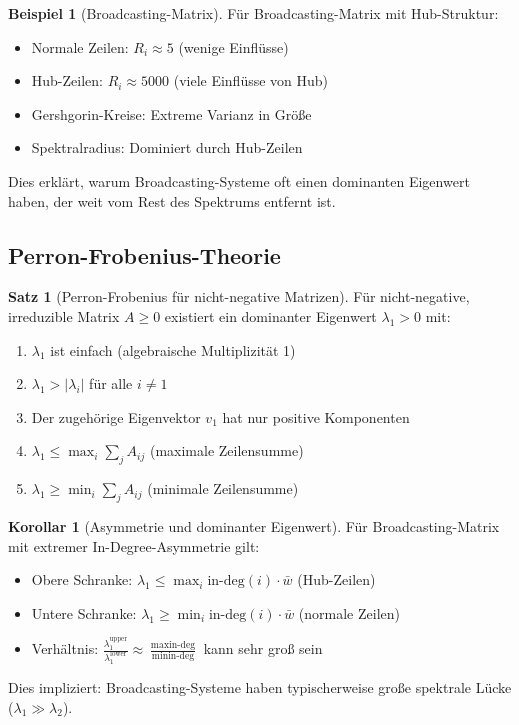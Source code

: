 ﻿\documentclass[a4paper,12pt]{report}
\theoremstyle{definition}
\newtheorem{beispiel}{Beispiel}
\newtheorem{satz}{Satz}
\newtheorem{korollar}{Korollar}
\begin{document}
	\begin{beispiel}[Broadcasting-Matrix]
		Für Broadcasting-Matrix mit Hub-Struktur:
		\begin{itemize}
			\item Normale Zeilen: $R_i \approx 5$ (wenige Einflüsse)
			\item Hub-Zeilen: $R_i \approx 5000$ (viele Einflüsse von Hub)
			\item Gershgorin-Kreise: Extreme Varianz in Größe
			\item Spektralradius: Dominiert durch Hub-Zeilen
		\end{itemize}
		
		Dies erklärt, warum Broadcasting-Systeme oft einen dominanten Eigenwert haben, der weit vom Rest des Spektrums entfernt ist.
	\end{beispiel}
	
	\subsection{Perron-Frobenius-Theorie}
	
	\begin{satz}[Perron-Frobenius für nicht-negative Matrizen]
		Für nicht-negative, irreduzible Matrix $A \geq 0$ existiert ein dominanter Eigenwert $\lambda_1 > 0$ mit:
		\begin{enumerate}
			\item $\lambda_1$ ist einfach (algebraische Multiplizität 1)
			\item $\lambda_1 > |\lambda_i|$ für alle $i \neq 1$
			\item Der zugehörige Eigenvektor $v_1$ hat nur positive Komponenten
			\item $\lambda_1 \leq \max_i \sum_j A_{ij}$ (maximale Zeilensumme)
			\item $\lambda_1 \geq \min_i \sum_j A_{ij}$ (minimale Zeilensumme)
		\end{enumerate}
	\end{satz}
	
	\begin{korollar}[Asymmetrie und dominanter Eigenwert]
		Für Broadcasting-Matrix mit extremer In-Degree-Asymmetrie gilt:
		\begin{itemize}
			\item Obere Schranke: $\lambda_1 \leq \max_i \text{in-deg}(i) \cdot \bar{w}$ (Hub-Zeilen)
			\item Untere Schranke: $\lambda_1 \geq \min_i \text{in-deg}(i) \cdot \bar{w}$ (normale Zeilen)
			\item Verhältnis: $\frac{\lambda_1^{\text{upper}}}{\lambda_1^{\text{lower}}} \approx \frac{\max \text{in-deg}}{\min \text{in-deg}}$ kann sehr groß sein
		\end{itemize}
		
		Dies impliziert: Broadcasting-Systeme haben typischerweise große spektrale Lücke ($\lambda_1 \gg \lambda_2$).
	\end{korollar}
	
\end{document}
